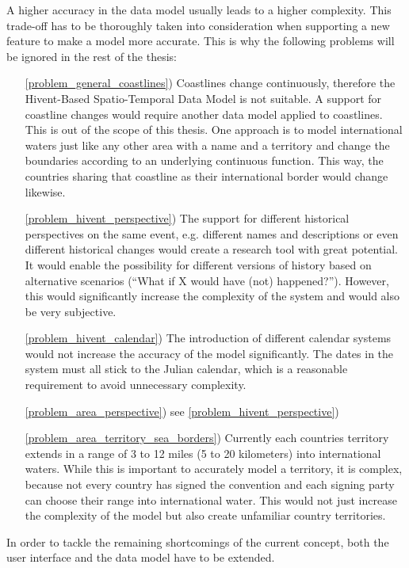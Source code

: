 A higher accuracy in the data model usually leads to a higher complexity. This trade-off has to be thoroughly taken into consideration when supporting a new feature to make a model more accurate. This is why the following problems will be ignored in the rest of the thesis:
\begin{itemize}
  \item [\ref{problem_general_coastlines})] Coastlines change continuously, therefore the Hivent-Based Spatio-Temporal Data Model is not suitable. A support for coastline changes would require another data model applied to coastlines. This is out of the scope of this thesis. One approach is to model international waters just like any other area with a name and a territory and change the boundaries according to an underlying continuous function. This way, the countries sharing that coastline as their international border would change likewise.
  \item[\ref{problem_hivent_perspective})] The support for different historical perspectives on the same event, e.g. different names and descriptions or even different historical changes would create a research tool with great potential. It would enable the possibility for different versions of history based on alternative scenarios (``What if X would have (not) happened?''). However, this would significantly increase the complexity of the system and would also be very subjective.
  \item[\ref{problem_hivent_calendar})] The introduction of different calendar systems would not increase the accuracy of the model significantly. The dates in the system must all stick to the Julian calendar, which is a reasonable requirement to avoid unnecessary complexity.
  \item[\ref{problem_area_perspective})] see \ref{problem_hivent_perspective})
  \item[\ref{problem_area_territory_sea_borders})] Currently each countries territory extends in a range of 3 to 12 miles (5 to 20 kilometers) \cite{UNSeaBorders} into international waters. While this is important to accurately model a territory, it is complex, because not every country has signed the convention and each signing party can choose their range into international water. %
  This would not just increase the complexity of the model but also create unfamiliar country territories.
\end{itemize}

In order to tackle the remaining shortcomings of the current concept, both the user interface and the data model have to be extended.

